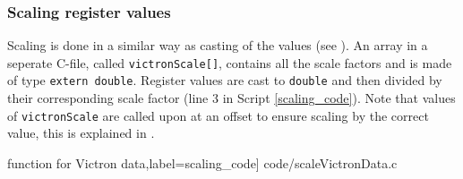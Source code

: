\subsubsection{Scaling register values}\label{sec:scaling}
Scaling is done in a similar way as casting of the values (see ). An array in a seperate C-file, called \verb|victronScale[]|, contains all the scale factors and is made of type \verb|extern double|. Register values are cast to \verb|double| and then divided by their corresponding scale factor (line 3 in Script \ref{scaling_code}). Note that values of \verb|victronScale| are called upon at an offset to ensure scaling by the correct value, this is explained in .

\scriptsize
	 function for Victron data,label=scaling_code] {code/scaleVictronData.c}
\normalsize

